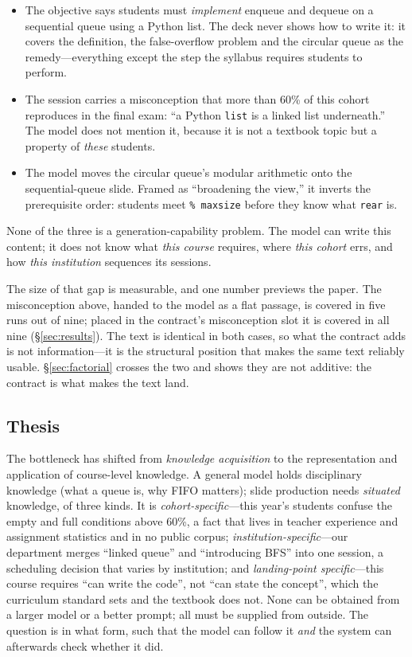 \documentclass[review,12pt]{elsarticle}
\renewcommand{\_}{\kgunderscore\allowbreak}
\newcommand{\id}[1]{\texttt{#1}}
\begin{document}
\begin{itemize}
  \item The objective says students must \emph{implement} enqueue and dequeue on
  a sequential queue using a Python list. The deck never shows how to
  write it: it covers the definition, the false-overflow problem and the
  circular queue as the remedy---everything except the step the syllabus
  requires students to perform.
  \item The session carries a misconception that more than 60\% of this cohort
  reproduces in the final exam: ``a Python \id{list} is a linked list
  underneath.'' The model does not mention it, because it is not a textbook
  topic but a property of \emph{these} students.
  \item The model moves the circular queue's modular arithmetic onto the
  sequential-queue slide. Framed as ``broadening the view,'' it inverts the
  prerequisite order: students meet \id{\% maxsize} before they know what
  \id{rear} is.
\end{itemize}

None of the three is a generation-capability problem. The model can write this
content; it does not know what \emph{this course} requires, where \emph{this
cohort} errs, and how \emph{this institution} sequences its sessions.

The size of that gap is measurable, and one number previews the paper. The
misconception above, handed to the model as a flat passage, is covered in five
runs out of nine; placed in the contract's misconception slot it is covered in
all nine (\S\ref{sec:results}). The text is identical in both cases, so what the
contract adds is not information---it is the structural position that makes the
same text reliably usable. \S\ref{sec:factorial} crosses the two and shows they
are not additive: the contract is what makes the text land.

\subsection{Thesis}
\label{sec:thesis}

The bottleneck has shifted from \emph{knowledge acquisition} to the
representation and application of course-level knowledge. A general
model holds disciplinary knowledge (what a queue is, why FIFO matters); slide
production needs \emph{situated} knowledge, of three kinds. It is
\emph{cohort-specific}---this year's students confuse the empty and full
conditions above 60\%, a fact that lives in teacher experience and assignment
statistics and in no public corpus; \emph{institution-specific}---our department
merges ``linked queue'' and ``introducing BFS'' into one session, a scheduling
decision that varies by institution; and \emph{landing-point specific}---this
course requires ``can write the code'', not ``can state the concept'', which the
curriculum standard sets and the textbook does not. None can be obtained from a
larger model or a better prompt; all must be supplied from outside. The question is in
what form, such that the model can follow it \emph{and} the system can
afterwards check whether it did.
\end{document}
